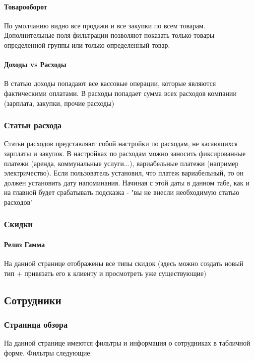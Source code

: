 \documentclass[DIV=calc, paper=a4, fontsize=11pt]{scrartcl} %
\begin{document}
\paragraph{Товарооборот}
По умолчанию видно все продажи и все закупки по всем товарам. Дополнительные поля фильтрации позволяют показать только товары определенной группы или только определенный товар.

\paragraph{Доходы vs Расходы}
В статью доходы попадают все кассовые операции, которые являются фактическими оплатами. В расходы попадает сумма всех расходов компании (зарплата, закупки, прочие расходы)

\subsubsection{Статьи расхода}
Статьи расходов представляют собой настройки по расходам, не касающихся зарплаты и закупок. В настройках по расходам можно заносить фиксированные платежи (аренда, коммунальные услуги...), вариабельные платежи (например электричество). Если пользователь установил, что платеж вариабельный, то он должен установить дату напоминания. Начиная с этой даты в данном табе, как и на главной будет срабатывать подсказка - "вы не внесли необходимую статью расходов"

\subsubsection{Скидки}

\paragraph{Релиз Гамма}
На данной странице отображены все типы скидок (здесь можно создать новый тип + привязать его к клиенту и просмотреть уже существующие)



\subsection{Сотрудники}

\subsubsection{Страница обзора}

На данной странице имеются фильтры и информация о сотрудниках в табличной форме. Фильтры следующие:
\end{document}
